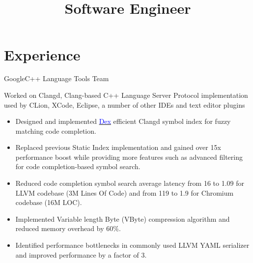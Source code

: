 \documentclass[11pt,a4paper,sans]{moderncv}
\title{Software Engineer}
\begin{document}
\makecvtitle

\section{Experience}
    {Google}{}{C++ Language Tools Team}
    {Worked on Clangd, Clang-based C++ Language Server Protocol implementation
     used by CLion, XCode, Eclipse, a number of other IDEs and text editor
     plugins
     \begin{itemize}
       \item Designed and implemented
         \href{https://docs.google.com/document/d/1C-A6PGT6TynyaX4PXyExNMiGmJ2jL1UwV91Kyx11gOI/edit?usp=sharing}
         {\textcolor{blue}{Dex}} efficient Clangd symbol index for fuzzy
         matching code completion.
       \item Replaced previous Static Index implementation and gained over 15x
         performance boost while providing more features such as advanced
         filtering for code completion-based symbol search.
       \item Reduced code completion symbol search average latency from
         \SI{16}{\mics} to \SI{1.09}{\mics} for LLVM codebase (3M Lines Of
         Code) and from \SI{119}{\mics} to \SI{1.9}{\mics} for Chromium
         codebase (16M LOC).
       \item Implemented Variable length Byte (VByte) compression algorithm and
         reduced memory overhead by 60\%.
       \item Identified performance bottlenecks in commonly used LLVM YAML
         serializer and improved performance by a factor of 3.
     \end{itemize}}
\end{document}
